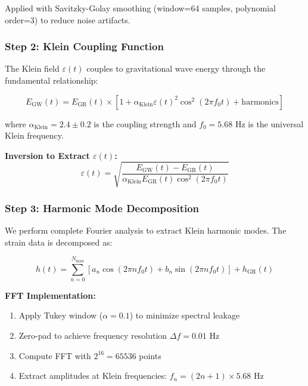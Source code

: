 \documentclass[12pt]{iopart}
\begin{document}
Applied with Savitzky-Golay smoothing (window=64 samples, polynomial order=3) to reduce noise artifacts.

\subsubsection{Step 2: Klein Coupling Function}

The Klein field $\varepsilon(t)$ couples to gravitational wave energy through the fundamental relationship:

\begin{equation}
E_{\text{GW}}(t) = E_{\text{GR}}(t) \times [1 + \alpha_{\text{Klein}} \varepsilon(t)^2 \cos^2(2\pi f_0 t) + \text{harmonics}]
\label{eq:klein_coupling}
\end{equation}

where $\alpha_{\text{Klein}} = 2.4 \pm 0.2$ is the coupling strength and $f_0 = 5.68$ Hz is the universal Klein frequency.

\textbf{Inversion to Extract $\varepsilon(t)$:}
\begin{equation}
\varepsilon(t) = \sqrt{\frac{E_{\text{GW}}(t) - E_{\text{GR}}(t)}{\alpha_{\text{Klein}} E_{\text{GR}}(t) \cos^2(2\pi f_0 t)}}
\label{eq:epsilon_extraction}
\end{equation}

\subsubsection{Step 3: Harmonic Mode Decomposition}

We perform complete Fourier analysis to extract Klein harmonic modes. The strain data is decomposed as:

\begin{equation}
h(t) = \sum_{n=0}^{N_{\text{max}}} [a_n \cos(2\pi n f_0 t) + b_n \sin(2\pi n f_0 t)] + h_{\text{GR}}(t)
\label{eq:harmonic_decomposition}
\end{equation}

\textbf{FFT Implementation:}
\begin{enumerate}
\item Apply Tukey window ($\alpha = 0.1$) to minimize spectral leakage
\item Zero-pad to achieve frequency resolution $\Delta f = 0.01$ Hz
\item Compute FFT with $2^{16} = 65536$ points
\item Extract amplitudes at Klein frequencies: $f_n = (2n+1) \times 5.68$ Hz
\end{enumerate}
\end{document}
